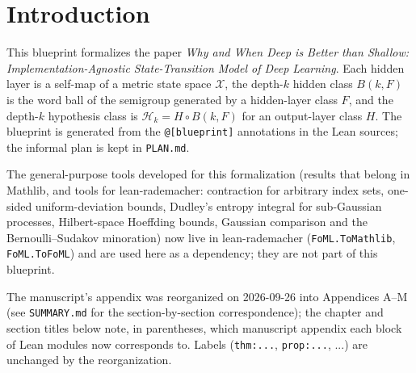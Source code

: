 %



\chapter{Introduction}

This blueprint formalizes the paper
\emph{Why and When Deep is Better than Shallow: Implementation-Agnostic
State-Transition Model of Deep Learning}.  Each hidden layer is a self-map of a
metric state space $\mathcal X$, the depth-$k$ hidden class $B(k,F)$ is the word
ball of the semigroup generated by a hidden-layer class $F$, and the depth-$k$
hypothesis class is $\mathcal H_k = H\circ B(k,F)$ for an output-layer class $H$.
The blueprint is generated from the \texttt{@[blueprint]} annotations in the
Lean sources; the informal plan is kept in \texttt{PLAN.md}.

The general-purpose tools developed for this formalization (results that belong in Mathlib, and tools for lean-rademacher: contraction for arbitrary index sets, one-sided uniform-deviation bounds, Dudley's entropy integral for sub-Gaussian processes, Hilbert-space Hoeffding bounds, Gaussian comparison and the Bernoulli--Sudakov minoration) now live in lean-rademacher (\texttt{FoML.ToMathlib}, \texttt{FoML.ToFoML}) and are used here as a dependency; they are not part of this blueprint.

The manuscript's appendix was reorganized on 2026-09-26 into Appendices
A--M (see \texttt{SUMMARY.md} for the section-by-section correspondence); the
chapter and section titles below note, in parentheses, which manuscript
appendix each block of Lean modules now corresponds to. Labels
(\texttt{thm:...}, \texttt{prop:...}, ...) are unchanged by the
reorganization.


